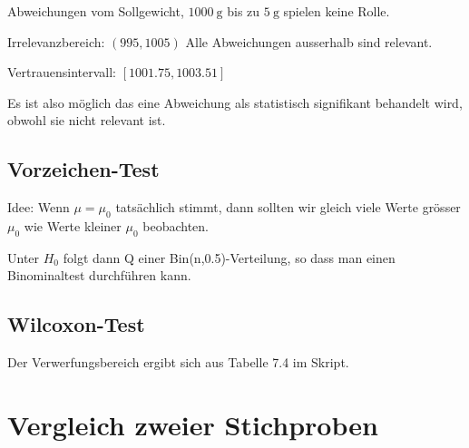 \documentclass[8pt,a4paper]{scrartcl}
\begin{document}
\begin{multicols*}{3}
Abweichungen vom Sollgewicht, $\SI{1000}{\gram}$ bis zu $\SI{5}{\gram}$ spielen keine Rolle.

Irrelevanzbereich: $(995,1005)$ Alle Abweichungen ausserhalb sind relevant.

Vertrauensintervall: $[1001.75,1003.51]$

Es ist also möglich das eine Abweichung als statistisch signifikant behandelt wird, obwohl sie nicht relevant ist.


\vfill
\null
\columnbreak

\subsection{Vorzeichen-Test}





Idee: Wenn $\mu=\mu_0$ tatsächlich stimmt, dann sollten wir gleich viele Werte grösser $\mu_0$ wie Werte kleiner $\mu_0$ beobachten.


Unter $H_0$ folgt dann Q einer Bin(n,0.5)-Verteilung, so dass man einen Binominaltest durchführen kann.

\subsection{Wilcoxon-Test}






Der Verwerfungsbereich ergibt sich aus Tabelle 7.4 im Skript.

\newpage

\section{Vergleich zweier Stichproben}


\end{multicols*}
\end{document}
